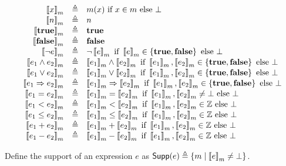 \documentclass[10pt]{article}
\theoremstyle{definition}
\begin{document}
{
\newcommand{\LINE}[2]{
    \Eval(#1,m) &\triangleq& #2 \\
}

\begin{displaymath}
\begin{array}{rcl}
\LINE x 
    {m(x) \text{ if } x \in m \text{ else } \bot}
\LINE n n
\LINE \True \True
\LINE \False \False
\LINE {\neg e} 
    {\neg \Eval(e,m) \text{ if } \Eval(e,m) \in \set{\True,\False} \text{ else } \bot}
\LINE {e_1 \wedge e_2} {
    \Eval(e_1,m) \wedge \Eval(e_2,m)
    \text{ if }
        \Eval(e_1,m), \Eval(e_2,m) \in \set{\True,\False}
    \text{ else } \bot}
\LINE {e_1 \vee e_2} {
    \Eval(e_1,m) \vee \Eval(e_2,m)
    \text{ if }
        \Eval(e_1,m), \Eval(e_2,m) \in \set{\True,\False}
    \text{ else } \bot}
\LINE {e_1 \Rightarrow e_2} {
    \Eval(e_1,m) \Rightarrow \Eval(e_2,m)
    \text{ if }
        \Eval(e_1,m), \Eval(e_2,m) \in \set{\True,\False}
    \text{ else } \bot}
\LINE {e_1 = e_2} {
    \Eval(e_1,m) = \Eval(e_2,m)
    \text{ if }
        \Eval(e_1,m), \Eval(e_2,m) \neq \bot
    \text{ else } \bot}
\LINE {e_1 < e_2} {
    \Eval(e_1,m) < \Eval(e_2,m)
    \text{ if }
        \Eval(e_1,m), \Eval(e_2,m) \in \Z
    \text{ else } \bot}
\LINE {e_1 \leq e_2} {
    \Eval(e_1,m) \leq \Eval(e_2,m)
    \text{ if }
        \Eval(e_1,m), \Eval(e_2,m) \in \Z
    \text{ else } \bot}
\LINE {e_1 + e_2} {
    \Eval(e_1,m) + \Eval(e_2,m)
    \text{ if }
        \Eval(e_1,m), \Eval(e_2,m) \in \Z
    \text{ else } \bot}
\LINE {e_1 - e_2} {
    \Eval(e_1,m) - \Eval(e_2,m)
    \text{ if }
        \Eval(e_1,m), \Eval(e_2,m) \in \Z
    \text{ else } \bot}
\end{array}
\end{displaymath}

}

Define the support of an expression $e$ as
$\Support e \triangleq \SetBuild(m | {\Eval(e,m) \neq \bot})$.
\end{document}
